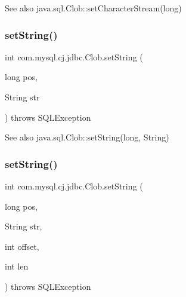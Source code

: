 \begin{DoxySeeAlso}{See also}
java.\+sql.\+Clob\+::set\+Character\+Stream(long) 
\end{DoxySeeAlso}
\mbox{\label{classcom_1_1mysql_1_1cj_1_1jdbc_1_1_clob_a16363c80864ce2bcbee073698856df78}} 
\subsubsection{\texorpdfstring{set\+String()}{setString()}\hspace{0.1cm}{\footnotesize\ttfamily [1/2]}}
{\footnotesize\ttfamily int com.\+mysql.\+cj.\+jdbc.\+Clob.\+set\+String (\begin{DoxyParamCaption}\item[{long}]{pos,  }\item[{String}]{str }\end{DoxyParamCaption}) throws S\+Q\+L\+Exception}

\begin{DoxySeeAlso}{See also}
java.\+sql.\+Clob\+::set\+String(long, String) 
\end{DoxySeeAlso}
\mbox{\label{classcom_1_1mysql_1_1cj_1_1jdbc_1_1_clob_ad219cc0c1ae1ab62a8819a31382d6276}} 
\subsubsection{\texorpdfstring{set\+String()}{setString()}\hspace{0.1cm}{\footnotesize\ttfamily [2/2]}}
{\footnotesize\ttfamily int com.\+mysql.\+cj.\+jdbc.\+Clob.\+set\+String (\begin{DoxyParamCaption}\item[{long}]{pos,  }\item[{String}]{str,  }\item[{int}]{offset,  }\item[{int}]{len }\end{DoxyParamCaption}) throws S\+Q\+L\+Exception}

